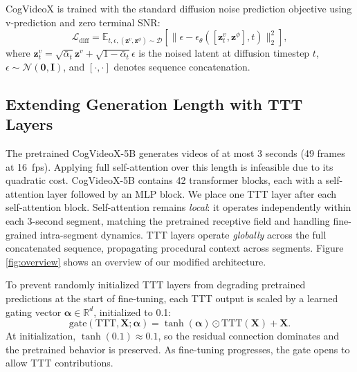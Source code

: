 \documentclass[runningheads]{llncs}
\begin{document}
CogVideoX is trained with the standard diffusion noise prediction objective using v-prediction and zero terminal SNR:
\begin{equation}
    \mathcal{L}_{\text{diff}} = \mathbb{E}_{t, \epsilon, (\mathbf{z}^v, \mathbf{z}^\phi) \sim \mathcal{D}} \left[ \| \epsilon - \epsilon_\theta([\mathbf{z}^v_t, \mathbf{z}^\phi], t) \|_2^2 \right],
\end{equation}
where $\mathbf{z}^v_t = \sqrt{\bar{\alpha}_t}\mathbf{z}^v + \sqrt{1 - \bar{\alpha}_t}\epsilon$ is the noised latent at diffusion timestep $t$, $\epsilon \sim \mathcal{N}(\mathbf{0}, \mathbf{I})$, and $[\cdot, \cdot]$ denotes sequence concatenation.

\subsection{Extending Generation Length with TTT Layers}

The pretrained CogVideoX-5B generates videos of at most 3 seconds (49 frames at 16~fps). Applying full self-attention over this length is infeasible due to its quadratic cost. CogVideoX-5B contains 42 transformer blocks, each with a self-attention layer followed by an MLP block. We place one TTT layer after each self-attention block. Self-attention remains \textit{local}: it operates independently within each 3-second segment, matching the pretrained receptive field and handling fine-grained intra-segment dynamics. TTT layers operate \textit{globally} across the full concatenated sequence, propagating procedural context across segments. Figure \ref{fig:overview} shows an overview of our modified architecture.

To prevent randomly initialized TTT layers from degrading pretrained predictions at the start of fine-tuning, each TTT output is scaled by a learned gating vector $\bm{\alpha} \in \mathbb{R}^d$, initialized to 0.1\cite{dalal2025oneminutevideogenerationtesttime}:
\begin{equation}
    \mathrm{gate}(\mathrm{TTT}, \mathbf{X}; \bm{\alpha}) = \tanh(\bm{\alpha}) \odot \mathrm{TTT}(\mathbf{X}) + \mathbf{X}.
\end{equation}
At initialization, $\tanh(0.1) \approx 0.1$, so the residual connection dominates and the pretrained behavior is preserved. As fine-tuning progresses, the gate opens to allow TTT contributions.
\end{document}
